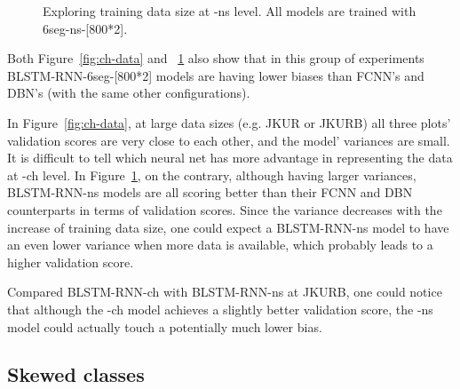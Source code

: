 \begin{figure}[htb]
{
	}
	\caption{Exploring training data size at -ns level. All models are trained with 6seg-ns-[800*2].}
	\label{fig:ns-data}
\end{figure}

Both Figure~\ref{fig:ch-data} and ~\ref{fig:ns-data} also show that in this group of experiments BLSTM-RNN-6seg-[800*2] models are having lower biases than FCNN's and DBN's (with the same other configurations).

In Figure~\ref{fig:ch-data}, at large data sizes (e.g. JKUR or JKURB) all three plots' validation scores are very close to each other, and the model' variances are small. It is difficult to tell which neural net has more advantage in representing the data at -ch level. In Figure~\ref{fig:ns-data}, on the contrary, although having larger variances, BLSTM-RNN-ns models are all scoring better than their FCNN and DBN counterparts in terms of validation scores. Since the variance decreases with the increase of training data size, one could expect a BLSTM-RNN-ns model to have an even lower variance when more data is available, which probably leads to a higher validation score.

Compared BLSTM-RNN-ch with BLSTM-RNN-ns at JKURB, one could notice that although the -ch model achieves a slightly better validation score, the -ns model could actually touch a potentially much lower bias. %

\subsection{Skewed classes}\label{sec:3-p7}


